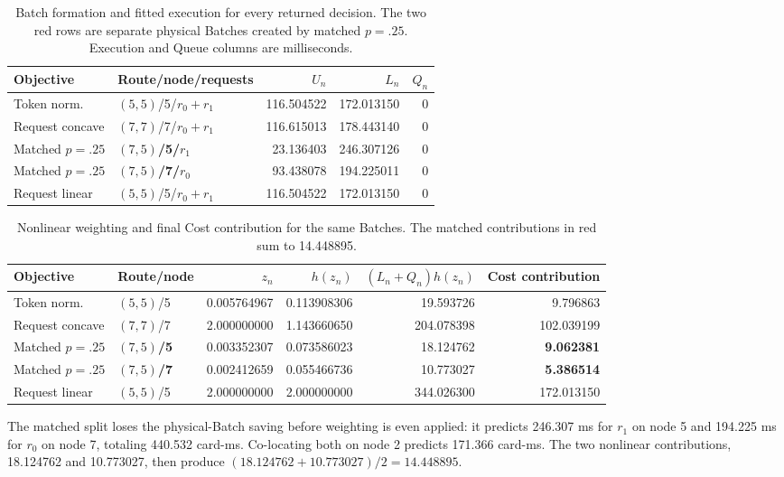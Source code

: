 \documentclass[10pt]{article}
\newcommand{\alertdata}[1]{\textcolor{red!70!black}{\textbf{#1}}}
\begin{document}
\begin{table}[t]
\centering
\footnotesize
\caption{Batch formation and fitted execution for every returned decision.
The two red rows are separate physical Batches created by matched $p=.25$.
Execution and Queue columns are milliseconds.}
\label{tab:decision-batch-cost}
\begin{tabular}{llrrr}
\toprule
Objective & Route/node/requests & $U_n$ & $L_n$ & $Q_n$ \\
\midrule
Token norm. & $(5,5)$/5/$r_0+r_1$ & 116.504522 & 172.013150 & 0 \\
Request concave & $(7,7)$/7/$r_0+r_1$ & 116.615013 & 178.443140 & 0 \\
Matched $p=.25$ & \alertdata{$(7,5)$/5/$r_1$} & 23.136403 & 246.307126 & 0 \\
Matched $p=.25$ & \alertdata{$(7,5)$/7/$r_0$} & 93.438078 & 194.225011 & 0 \\
Request linear & $(5,5)$/5/$r_0+r_1$ & 116.504522 & 172.013150 & 0 \\
\bottomrule
\end{tabular}
\end{table}

\begin{table}[t]
\centering
\footnotesize
\caption{Nonlinear weighting and final Cost contribution for the same
Batches. The matched contributions in red sum to 14.448895.}
\label{tab:decision-batch-weight}
\begin{tabular}{llrrrr}
\toprule
Objective & Route/node & $z_n$ & $h(z_n)$ & $(L_n+Q_n)h(z_n)$ & Cost contribution \\
\midrule
Token norm. & $(5,5)$/5 & 0.005764967 & 0.113908306 & 19.593726 & 9.796863 \\
Request concave & $(7,7)$/7 & 2.000000000 & 1.143660650 & 204.078398 & 102.039199 \\
Matched $p=.25$ & \alertdata{$(7,5)$/5} & 0.003352307 & 0.073586023 & 18.124762 & \alertdata{9.062381} \\
Matched $p=.25$ & \alertdata{$(7,5)$/7} & 0.002412659 & 0.055466736 & 10.773027 & \alertdata{5.386514} \\
Request linear & $(5,5)$/5 & 2.000000000 & 2.000000000 & 344.026300 & 172.013150 \\
\bottomrule
\end{tabular}
\end{table}

The matched split loses the physical-Batch saving before weighting is even
applied: it predicts 246.307 ms for $r_1$ on node 5 and 194.225 ms for $r_0$
on node 7, totaling 440.532 card-ms. Co-locating both on node 2 predicts
171.366 card-ms. The two nonlinear contributions, 18.124762 and 10.773027,
then produce $(18.124762+10.773027)/2=14.448895$.
\end{document}
